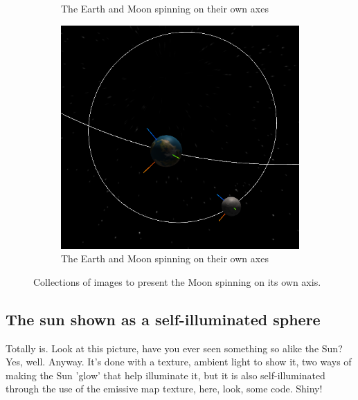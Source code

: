 \documentclass[12pt]{article}
\begin{document}
\begin{figure}[H]
\begin{subfigure}[b]{0.4\textwidth}
                \caption{The Earth and Moon spinning on their own axes}
                \label{fig: The axial spin of the Earth and moon.}
       \end{subfigure}
               \begin{subfigure}[b]{0.4\textwidth}
                \includegraphics[width=\textwidth]{images/earthandmoonaxisspinabove4}
                \caption{The Earth and Moon spinning on their own axes}
                \label{fig: The axial spin of the Earth and moon.}
       \end{subfigure}
       \caption{Collections of images to present the Moon spinning on its own axis.}\label{fig: The Moon's axial rotation.}
\end{figure}

\subsection{The sun shown as a self-illuminated sphere}
Totally is. Look at this picture, have you ever seen something so alike the Sun? Yes, well. Anyway. It's done with a texture, ambient light to show it, two ways of making the Sun 'glow' that help illuminate it, but it is also self-illuminated through the use of the emissive map texture, here, look, some code. Shiny!
\end{document}
